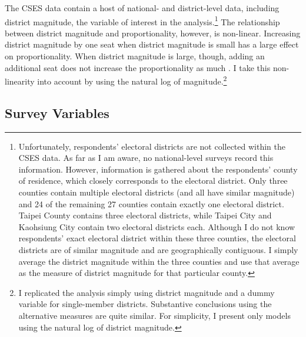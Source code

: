 \documentclass[12pt]{article}
\begin{document}
The CSES data contain a host of national- and district-level data, including district magnitude, the variable of interest in the analysis.\footnote{Unfortunately, respondents' electoral districts are not collected within the CSES data. As far as I am aware, no national-level surveys record this information. However, information is gathered about the respondents' county of residence, which closely corresponds to the electoral district. Only three counties contain multiple electoral districts (and all have similar magnitude) and 24 of the remaining 27 counties contain exactly one electoral district. Taipei County contains three electoral districts, while Taipei City and Kaohsiung City contain two electoral districts each. Although I do not know respondents' exact electoral district within these three counties, the electoral districts are of similar magnitude and are geographically contiguous. I simply average the district magnitude within the three counties and use that average as the measure of district magnitude for that particular county.} The relationship between district magnitude and proportionality, however, is non-linear. Increasing district magnitude by one seat when district magnitude is small has a large effect on proportionality. When district magnitude is large, though, adding an additional seat does not increase the proportionality as much \citep{GrofmanSelb2011}. I take this non-linearity into account by using the natural log of magnitude.\footnote{I replicated the analysis simply using district magnitude and a dummy variable for single-member districts. Substantive conclusions using the alternative measures are quite similar. For simplicity, I present only models using the natural log of district magnitude.}

\subsection*{Survey Variables}
\end{document}
